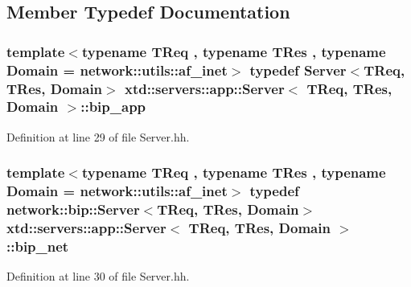\subsection{Member Typedef Documentation}
\subsubsection[{\texorpdfstring{bip\+\_\+app}{bip_app}}]{\setlength{\rightskip}{0pt plus 5cm}template$<$typename T\+Req , typename T\+Res , typename Domain  = network\+::utils\+::af\+\_\+inet$>$ typedef {\bf Server}$<$T\+Req, T\+Res, Domain$>$ {\bf xtd\+::servers\+::app\+::\+Server}$<$ T\+Req, T\+Res, Domain $>$\+::{\bf bip\+\_\+app}\hspace{0.3cm}{\ttfamily [protected]}}\hypertarget{classxtd_1_1servers_1_1app_1_1Server_a6159422bbffe0fd3d02eb21c4e61011e}{}\label{classxtd_1_1servers_1_1app_1_1Server_a6159422bbffe0fd3d02eb21c4e61011e}


Definition at line 29 of file Server.\+hh.

\subsubsection[{\texorpdfstring{bip\+\_\+net}{bip_net}}]{\setlength{\rightskip}{0pt plus 5cm}template$<$typename T\+Req , typename T\+Res , typename Domain  = network\+::utils\+::af\+\_\+inet$>$ typedef network\+::bip\+::\+Server$<$T\+Req, T\+Res, Domain$>$ {\bf xtd\+::servers\+::app\+::\+Server}$<$ T\+Req, T\+Res, Domain $>$\+::{\bf bip\+\_\+net}\hspace{0.3cm}{\ttfamily [protected]}}\hypertarget{classxtd_1_1servers_1_1app_1_1Server_a7254e9a899be59bbe8ea13ca127108dc}{}\label{classxtd_1_1servers_1_1app_1_1Server_a7254e9a899be59bbe8ea13ca127108dc}


Definition at line 30 of file Server.\+hh.

